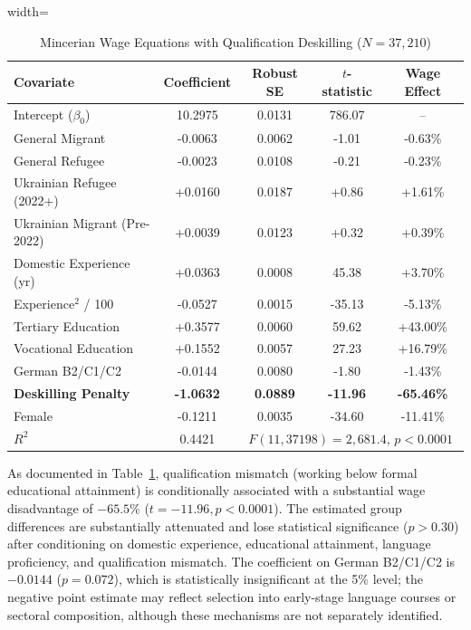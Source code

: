 \documentclass[conference]{IEEEtran}
\begin{document}
\begin{table}[htbp]
\caption{Mincerian Wage Equations with Qualification Deskilling ($N = 37,210$)}
\centering
\begin{adjustbox}{width=\columnwidth}
\begin{tabular}{lcccc}
\toprule
\textbf{Covariate} & \textbf{Coefficient} & \textbf{Robust SE} & \textbf{$t$-statistic} & \textbf{Wage Effect} \\
\midrule
Intercept ($\beta_0$) & 10.2975 & 0.0131 & 786.07 & -- \\
General Migrant & -0.0063 & 0.0062 & -1.01 & -0.63\% \\
General Refugee & -0.0023 & 0.0108 & -0.21 & -0.23\% \\
Ukrainian Refugee (2022+) & +0.0160 & 0.0187 & +0.86 & +1.61\% \\
Ukrainian Migrant (Pre-2022) & +0.0039 & 0.0123 & +0.32 & +0.39\% \\
Domestic Experience (yr) & +0.0363 & 0.0008 & 45.38 & +3.70\% \\
Experience$^2$ / 100 & -0.0527 & 0.0015 & -35.13 & -5.13\% \\
Tertiary Education & +0.3577 & 0.0060 & 59.62 & +43.00\% \\
Vocational Education & +0.1552 & 0.0057 & 27.23 & +16.79\% \\
German B2/C1/C2 & -0.0144 & 0.0080 & -1.80 & -1.43\% \\
\textbf{Deskilling Penalty} & \textbf{-1.0632} & \textbf{0.0889} & \textbf{-11.96} & \textbf{-65.46\%} \\
Female & -0.1211 & 0.0035 & -34.60 & -11.41\% \\
\midrule
$R^2$ & 0.4421 & \multicolumn{3}{c}{$F(11, 37198) = 2,681.4$, $p < 0.0001$} \\
\bottomrule
\end{tabular}
\end{adjustbox}
\label{tab:wage_reg}
\end{table}

As documented in Table~\ref{tab:wage_reg}, qualification mismatch (working below formal educational attainment) is conditionally associated with a substantial wage disadvantage of $-65.5\%$ ($t = -11.96, p < 0.0001$). The estimated group differences are substantially attenuated and lose statistical significance ($p > 0.30$) after conditioning on domestic experience, educational attainment, language proficiency, and qualification mismatch. The coefficient on German B2/C1/C2 is $-0.0144$ ($p = 0.072$), which is statistically insignificant at the 5\% level; the negative point estimate may reflect selection into early-stage language courses or sectoral composition, although these mechanisms are not separately identified.
\end{document}
